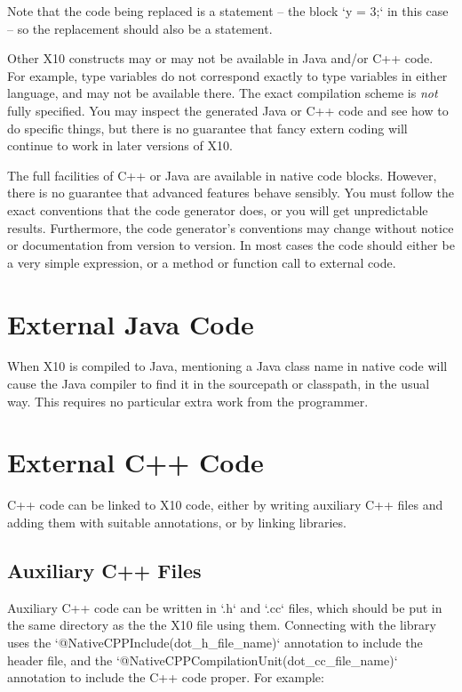Note that the code being replaced is a statement -- the block \xcd`{y = 3;}`
in this case -- so the replacement should also be a statement. 


Other X10 constructs may or may not be available in Java and/or C++ code.  For
example, type variables do not correspond exactly to type variables in either
language, and may not be available there.  The exact compilation scheme is
{\em not} fully specified.  You may inspect the generated Java or C++ code and
see how to do specific things, but there is no guarantee that fancy extern
coding will continue to work in later versions of X10.



The full facilities of C++ or Java are available in native code blocks.
However, there is no guarantee that advanced features behave sensibly. You
must follow the exact conventions that the code generator does, or you will
get unpredictable results.  Furthermore, the code generator's conventions may
change without notice or documentation from version to version.  In most cases
the  code should either be a very simple expression, or a method
or function call to external code.


\section{External Java Code}

When X10 is compiled to Java, mentioning a Java class name in native code will
cause the Java compiler to find it in the sourcepath or classpath, in the
usual way.  This requires no particular extra work from the programmer.


\section{External C++ Code}

C++ code can be linked to X10 code, either by writing auxiliary C++ files and
adding them with suitable annotations, or by linking libraries.

\subsection{Auxiliary C++ Files}

Auxiliary C++ code can be written in \xcd`.h` and \xcd`.cc` files, which
should be put in the same directory as the the X10 file using them.
Connecting with the library uses the \xcd`@NativeCPPInclude(dot_h_file_name)`
annotation to include the header file, and the 
\xcd`@NativeCPPCompilationUnit(dot_cc_file_name)` annotation to include the
C++ code proper.  For example: 

